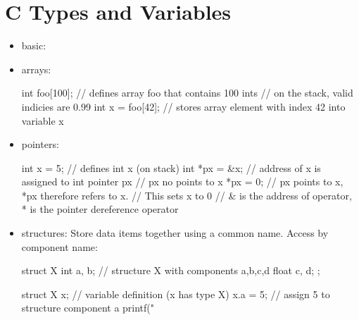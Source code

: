 \documentclass[a4paper,11pt]{article}
\begin{document}
\section{C Types and Variables}
\begin{itemize}
    \item basic: 
    \item arrays:
\begin{cppcode}
int foo[100];       // defines array foo that contains 100 ints
                    // on the stack, valid indicies are 0.99
int x = foo[42];    // stores array element with index 42 into variable x
\end{cppcode}
    \item pointers:
\begin{cppcode}
int x = 5;  // defines int x (on stack)
int *px = &x;   // address of x is assigned to int pointer px
                // px no points to x 
*px = 0;        // px points to x, *px therefore refers to x.
                // This sets x to 0
                // & is the address of operator, * is the pointer dereference operator
\end{cppcode}
    \item structures: Store data items together using a common name. Access by component name:
\begin{cppcode}
struct X {
    int a, b;           // structure X with components a,b,c,d
    float c, d;
};

struct X x;             // variable definition (x has type X)
x.a = 5;                // assign 5 to structure component a
printf("%
\end{cppcode}
\end{itemize}

\end{document}
